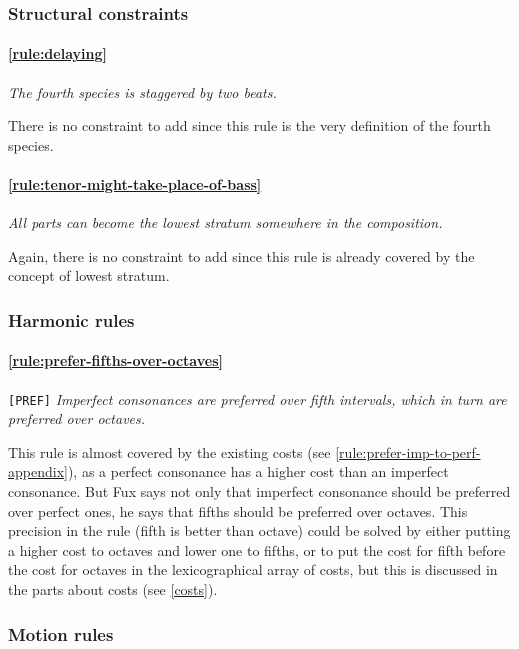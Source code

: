 \subsubsection{Structural constraints}
    \paragraph{\hspace{.5cm}\ref{rule:delaying}} \textit{The fourth species is staggered by two beats.}

    There is no constraint to add since this rule is the very definition of the fourth species.

    \paragraph{\hspace{.5cm}\ref{rule:tenor-might-take-place-of-bass}} \textit{All parts can become the lowest stratum somewhere in the composition.} 
    
    Again, there is no constraint to add since this rule is already covered by the concept of lowest stratum.


\subsubsection{Harmonic rules}
\paragraph{\hspace{.6cm}\ref{rule:prefer-fifths-over-octaves}} \texttt{[PREF]} \textit{Imperfect consonances are preferred over fifth intervals, which in turn are preferred over octaves.}   

    This rule is almost covered by the existing costs (see \ref{rule:prefer-imp-to-perf-appendix}), as a perfect consonance has a higher cost than an imperfect consonance. But Fux says not only that imperfect consonance should be preferred over perfect ones, he says that fifths should be preferred over octaves. This precision in the rule (fifth is better than octave) could be solved by either putting a higher cost to octaves and lower one to fifths, or to put the cost for fifth before the cost for octaves in the lexicographical array of costs, but this is discussed in the parts about costs (see \ref{costs}).


\subsubsection{Motion rules}
